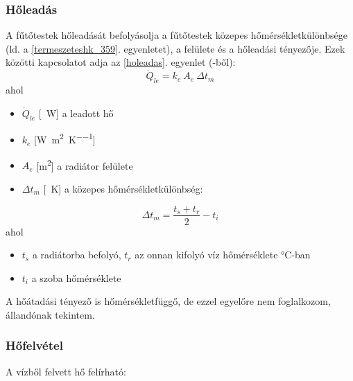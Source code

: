 \subsubsection{Hőleadás}
A fűtőtestek hőleadását befolyásolja a fűtőtestek közepes hőmérsékletkülönbsége (ld. a \ref{termeszeteshk_359}. egyenletet), a felülete és a hőleadási tényezője.
%
Ezek közötti kapcsolatot adja az \ref{holeadas}. egyenlet (\cite[358.~o.]{Herz}-ből): 
\begin{equation} \label{holeadas}
\dot Q_{le} = k_e ~ A_e ~ \Delta t_m
\end{equation}
%
%
ahol
\begin{itemize}[itemsep=6pt,topsep=0pt,parsep=0pt,partopsep=0pt]
\item[] $\dot{Q}_{le}$ [\SI{}{\watt}] a leadott hő
\item[] $k_e$ [\si[per-mode = fraction]{\watt\per\meter\squared\per\kelvin}]
\item[] $A_e$ [\si{\metre\squared}] a radiátor felülete
\item[] $\Delta t_m$ [\SI{}{\kelvin}] a közepes hőmérsékletkülönbség:
\end{itemize}
%
\begin{equation} \label{termeszeteshk_359}
\Delta t_m = \frac{t_s+t_r}{2} -t_{i}
\end{equation}
ahol
%
\begin{itemize}[itemsep=6pt,topsep=0pt,parsep=0pt,partopsep=0pt]
	\item[] $t_s$ a radiátorba befolyó, $t_r$ az onnan kifolyó víz hőmérséklete \si{\degreeCelsius}-ban
	\item[] $t_i$ a szoba hőmérséklete
\end{itemize}
%
A hőátadási tényező is hőmérsékletfüggő, de ezzel egyelőre nem foglalkozom, állandónak tekintem.
%
%
%
%

\subsubsection{Hőfelvétel}
A vízből felvett hő felírható:

